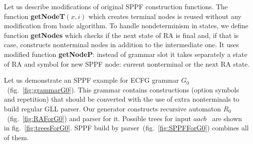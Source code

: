 \documentclass[runningheads,a4paper]{llncs}
\begin{document}
Let us describe modifications of original SPPF construction functions.
The function \textbf{getNodeT$(x,i)$} which creates terminal nodes is reused without any modification from basic algorithm.
To handle nondeterminism in states, we define function \textbf{getNodes} which checks if the next state of RA
is final and, if that is case, constructs nonterminal nodes in addition to the intermediate one.
It uses modified function \textbf{getNodeP}: instead of grammar slot it takes separately a 
state of RA and symbol for new SPPF node: current nonterminal or the next RA state.




Let us demonstrate an SPPF example for ECFG grammar $G_0$~(fig.~\ref{fig:grammarG0}).
This grammar contains constructions (option symbols and repetition) that should be converted with the use of extra nonterminals to build regular GLL parser.
Our generator constructs recursive automaton $R_0$~(fig.~\ref{fig:RAForG0}) and parser for it.
Possible trees for input $aacb$ \ are shown in fig.~\ref{fig:treesForG0}.
SPPF build by parser~(fig.~\ref{fig:SPPFForG0}) combines all of them.
\end{document}
